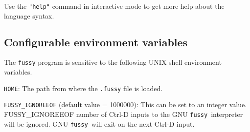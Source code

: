 \documentclass[11pt]{article}
\newcommand{\Fussy}{GNU {\tt fussy}}
\begin{document}
Use the {\tt "help"} command in interactive mode to get more help about the language syntax.

\subsection{Configurable environment variables}

The {\tt fussy} program is sensitive to the following UNIX shell environment variables.

{\tt HOME}: The path from where the {\tt .fussy} file is loaded.

{\tt FUSSY\_IGNOREEOF} (default value = 1000000): This can be set to an integer value.  FUSSY\_IGNOREEOF number of
Ctrl-D inputs to the \Fussy\ interpreter will be ignored. \Fussy\ will exit on the next
Ctrl-D input.
\end{document}
